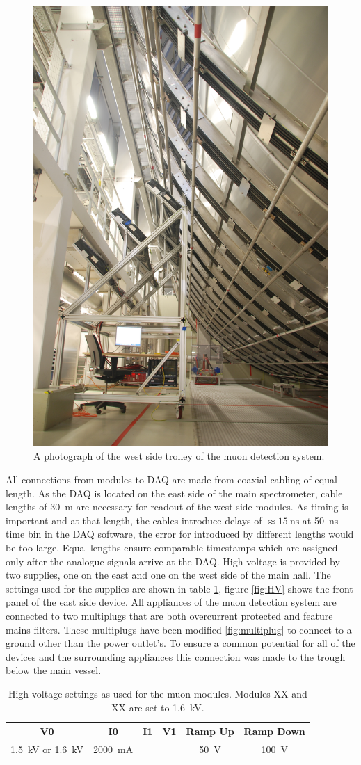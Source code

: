   \begin{figure}
  	\centering
  	\includegraphics[angle = 90, width = 0.5 \textwidth]{graphics/muonModules/mainSpec/eastSide.JPG}
  	\caption[Module locations]{A photograph of the west side trolley of the muon detection system. }
  \end{figure}
  All connections from modules to DAQ are made from coaxial cabling of equal length. As the DAQ is located on the east side of the main spectrometer, cable lengths of \SI{30}{\meter} are necessary for readout of the west side modules. As timing is important and at that length, the cables introduce delays of $\approx \SI{15}{\nano\second}$ at \SI{50}{\nano\second} time bin in the DAQ software, the error for introduced by different lengths would be too large. Equal lengths ensure comparable timestamps which are assigned only after the analogue signals arrive at the DAQ. High voltage is provided by two supplies, one on the east and one on the west side of the main hall. The settings used for the supplies are shown in table  \ref{tab:HVSettings}, figure \ref{fig:HV} shows the front panel of the east side device.
  All appliances of the muon detection system are connected to two multiplugs that are both overcurrent protected and feature mains filters. These multiplugs have been modified \ref{fig:multiplug} to connect to a ground other than the power outlet's. To ensure a common potential for all of the devices and the surrounding appliances this connection was made to the trough below the main vessel.
  \begin{table}
  \centering
  	\begin{tabular}{|c|c|c|c|c|c|}
  	\hline
  		V0 & I0 & I1 & V1 & Ramp Up & Ramp Down\\
  		\hline
  		\SI{1.5}{\kilo\volt} or \SI{1.6}{\kilo\volt} & \SI{2000}{\milli\ampere} & & & \SI{50}{\volt} & \SI{100}{\volt}\\
  		\hline
  	\end{tabular}
  	\caption[High voltage settings]{High voltage settings as used for the muon modules. Modules XX and XX are set to \SI{1.6}{\kilo\volt}.}
  	\label{tab:HVSettings}
  \end{table}
